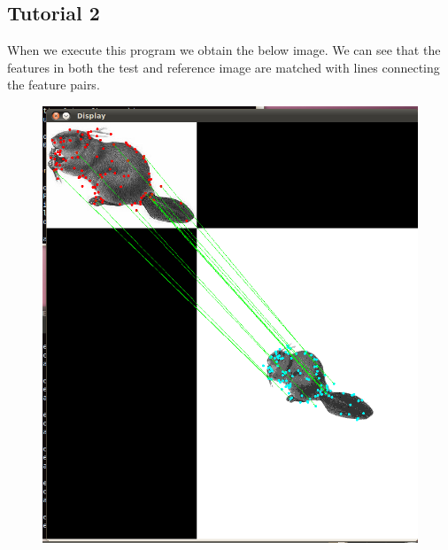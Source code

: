 \documentclass[10pt, titlepage, onecolumn, fleqn]{article}
\begin{document}
\subsection{Tutorial 2}
When we execute this program we obtain the below image. We can see that the features in both the test and reference image are matched with lines connecting the feature pairs.
\begin{figure}[H]
\begin{center} \includegraphics[height=0.8\textwidth]{lab01/lab01_material/part1/me132_tutorial_camera/capture.png} \end{center} \label{tut2}
\end{figure}
\end{document}
